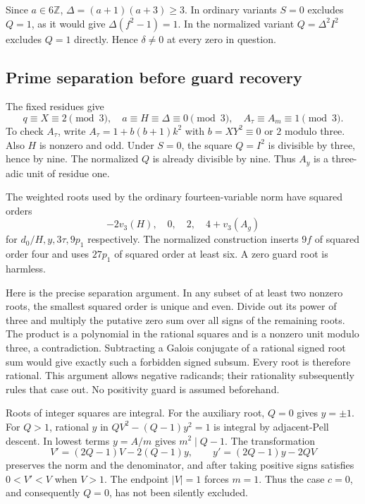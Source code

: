 Since $a\in6\mathbb Z$, $\Delta=(a+1)(a+3)\ge3$.
In ordinary variants $S=0$ excludes $Q=1$, as it would give
$\Delta(f^2-1)=1$. In the normalized variant $Q=\Delta^2I^2$ excludes
$Q=1$ directly. Hence $\delta\ne0$ at every zero in question.

\subsection{Prime separation before guard recovery}
The fixed residues give
\[
 q\equiv X\equiv2\pmod3,\quad a\equiv H\equiv\Delta\equiv0\pmod3,
 \quad A_\tau\equiv A_m\equiv1\pmod3.
\]
To check $A_\tau$, write $A_\tau=1+b(b+1)k^2$ with
$b=XY^2\equiv0$ or $2$ modulo three.
Also $H$ is nonzero and odd. Under $S=0$, the square $Q=I^2$ is divisible
by three, hence by nine. The normalized $Q$ is already divisible by nine.
Thus $A_y$ is a three-adic unit of residue one.

The weighted roots used by the ordinary fourteen-variable norm have
squared orders
\[
 -2v_3(H),\quad0,\quad2,\quad4+v_3(A_g)
\]
for $d_0/H,y,3\tau,9p_1$ respectively. The normalized construction
inserts $9f$ of squared order four and uses $27p_1$ of squared order
at least six. A zero guard root is harmless.

Here is the precise separation argument. In any subset of at least two
nonzero roots, the smallest squared order is unique and even. Divide
out its power of three and multiply the putative zero sum over all signs
of the remaining roots. The product is a polynomial in the rational
squares and is a nonzero unit modulo three, a contradiction.
Subtracting a Galois conjugate of a rational signed root sum would give
exactly such a forbidden signed subsum. Every root is therefore rational.
This argument allows negative radicands; their rationality subsequently
rules that case out. No positivity guard is assumed beforehand.

Roots of integer squares are integral. For the auxiliary root, $Q=0$
gives $y=\pm1$. For $Q>1$, rational $y$ in
$QV^2-(Q-1)y^2=1$ is integral by adjacent-Pell descent. In lowest terms
$y=A/m$ gives $m^2\mid Q-1$. The transformation
\[
 V'=(2Q-1)V-2(Q-1)y,\qquad
 y'=(2Q-1)y-2QV
\]
preserves the norm and the denominator, and after taking positive signs
satisfies $0<V'<V$ when $V>1$. The endpoint $|V|=1$ forces $m=1$.
Thus the case $c=0$, and consequently $Q=0$, has not been silently excluded.

